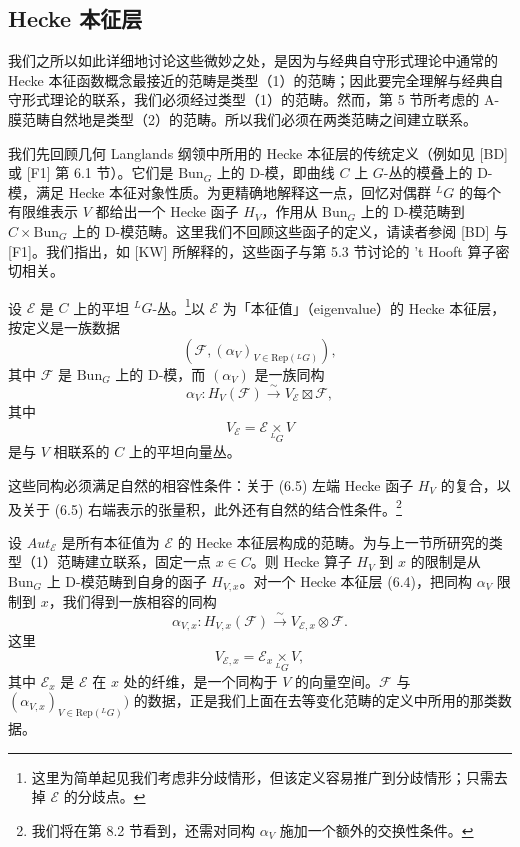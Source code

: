 \documentclass[11pt,a4paper]{article}
\newcommand{\Bun}{\mathrm{Bun}}
\begin{document}
\subsection{Hecke 本征层}

我们之所以如此详细地讨论这些微妙之处，是因为与经典自守形式理论中通常的 Hecke 本征函数概念最接近的范畴是类型（1）的范畴；因此要完全理解与经典自守形式理论的联系，我们必须经过类型（1）的范畴。然而，第 5 节所考虑的 A-膜范畴自然地是类型（2）的范畴。所以我们必须在两类范畴之间建立联系。

我们先回顾几何 Langlands 纲领中所用的 Hecke 本征层的传统定义（例如见 [BD] 或 [F1] 第 6.1 节）。它们是 $\Bun_G$ 上的 D-模，即曲线 $C$ 上 $G$-丛的模叠上的 D-模，满足 Hecke 本征对象性质。为更精确地解释这一点，回忆对偶群 ${}^LG$ 的每个有限维表示 $V$ 都给出一个 Hecke 函子 $H_V$，作用从 $\Bun_G$ 上的 D-模范畴到 $C\times\Bun_G$ 上的 D-模范畴。这里我们不回顾这些函子的定义，请读者参阅 [BD] 与 [F1]。我们指出，如 [KW] 所解释的，这些函子与第 5.3 节讨论的 't Hooft 算子密切相关。


设 $\mathcal{E}$ 是 $C$ 上的平坦 ${}^LG$-丛。\footnote{这里为简单起见我们考虑非分歧情形，但该定义容易推广到分歧情形；只需去掉 $\mathcal{E}$ 的分歧点。}以 $\mathcal{E}$ 为「本征值」（eigenvalue）的 Hecke 本征层，按定义是一族数据
\begin{equation}\tag{6.4}
(\mathcal{F},(\alpha_V)_{V\in\mathrm{Rep}({}^LG)}),
\end{equation}
其中 $\mathcal{F}$ 是 $\Bun_G$ 上的 D-模，而 $(\alpha_V)$ 是一族同构
\begin{equation}\tag{6.5}
\alpha_V : H_V(\mathcal{F})\xrightarrow{\sim} V_{\mathcal{E}}\boxtimes\mathcal{F},
\end{equation}
其中
\[
V_{\mathcal{E}} = \mathcal{E}\underset{{}^LG}{\times} V
\]
是与 $V$ 相联系的 $C$ 上的平坦向量丛。

这些同构必须满足自然的相容性条件：关于 (6.5) 左端 Hecke 函子 $H_V$ 的复合，以及关于 (6.5) 右端表示的张量积，此外还有自然的结合性条件。\footnote{我们将在第 8.2 节看到，还需对同构 $\alpha_V$ 施加一个额外的交换性条件。}

设 $Aut_{\mathcal{E}}$ 是所有本征值为 $\mathcal{E}$ 的 Hecke 本征层构成的范畴。为与上一节所研究的类型（1）范畴建立联系，固定一点 $x\in C$。则 Hecke 算子 $H_V$ 到 $x$ 的限制是从 $\Bun_G$ 上 D-模范畴到自身的函子 $H_{V,x}$。对一个 Hecke 本征层 (6.4)，把同构 $\alpha_V$ 限制到 $x$，我们得到一族相容的同构
\begin{equation}\tag{6.6}
\alpha_{V,x} : H_{V,x}(\mathcal{F})\xrightarrow{\sim} V_{\mathcal{E},x}\otimes\mathcal{F}.
\end{equation}
这里
\[
V_{\mathcal{E},x} = \mathcal{E}_x\underset{{}^LG}{\times} V,
\]
其中 $\mathcal{E}_x$ 是 $\mathcal{E}$ 在 $x$ 处的纤维，是一个同构于 $V$ 的向量空间。$\mathcal{F}$ 与 $(\alpha_{V,x})_{V\in\mathrm{Rep}({}^LG)})$ 的数据，正是我们上面在去等变化范畴的定义中所用的那类数据。
\end{document}
